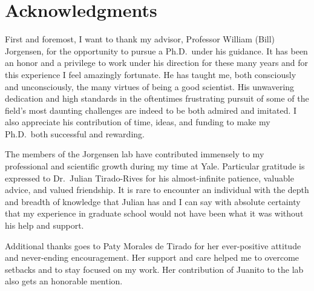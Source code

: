 \documentclass[12pt]{report}
\begin{document}

\tableofcontents
\newpage
{}     
\setcounter{page}{1}
\pagestyle{plain}
\listoffigures
\newpage
{}
\listoftables
\newpage



\chapter*{Acknowledgments}

\noindent First and foremost, I want to thank my advisor, Professor William (Bill) Jorgensen, for the opportunity to pursue a Ph.D.\ under his guidance.  It has been an honor and a privilege to work under his direction for these many years and for this experience I feel amazingly fortunate. He has taught me, both consciously and unconsciously, the many virtues of being a good scientist. His unwavering dedication and high standards in the oftentimes frustrating pursuit of some of the field's most daunting challenges are indeed to be both admired and imitated. I also appreciate his contribution of time, ideas, and funding to make my Ph.D.\ both successful and rewarding.

The members of the Jorgensen lab have contributed immensely to my professional and scientific growth during my time at Yale. Particular gratitude is expressed to Dr.\ Julian Tirado-Rives for his almost-infinite patience, valuable advice, and valued friendship. It is rare to encounter an individual with the depth and breadth of knowledge that Julian has and I can say with absolute certainty that my experience in graduate school would not have been what it was without his help and support. 

Additional thanks goes to Paty Morales de Tirado for her ever-positive attitude and never-ending encouragement. Her support and care helped me to overcome setbacks and to stay focused on my work. Her contribution of Juanito to the lab also gets an honorable mention.
\end{document}
